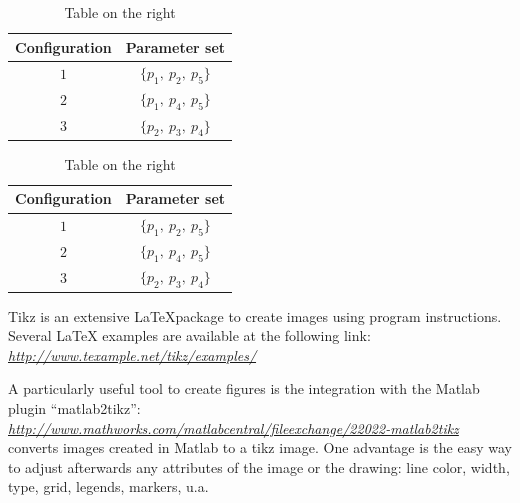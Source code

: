 \begin{table}[htbp]
\caption{Main numbering}
\centering
	\begin{subtable}[t]{.5\textwidth}
	\centering
			\caption{Table on the left}
			\begin{tabular}{cc}
				\toprule
				Configuration & Parameter set \\
				\midrule
				$1$ & $\{p_{1}, \: p_{2}, \: p_{5}\}$ \\
				$2$ & $\{p_{1}, \: p_{4}, \: p_{5}\}$ \\
				$3$ & $\{p_{2}, \: p_{3}, \: p_{4}\}$ \\
				\bottomrule
			\end{tabular}
			\label{tab:parameter_tabelle1}
	\end{subtable}%
	\begin{subtable}[t]{.5\textwidth}
			\centering
			\caption{Table on the right}
			\begin{tabular}{cc}
				\toprule
				Configuration & Parameter set \\
				\midrule
				$1$ & $\{p_{1}, \: p_{2}, \: p_{5}\}$ \\
				$2$ & $\{p_{1}, \: p_{4}, \: p_{5}\}$ \\
				$3$ & $\{p_{2}, \: p_{3}, \: p_{4}\}$ \\
				\bottomrule
			\end{tabular}
			\label{tab:parameter_tabelle2}
	\end{subtable}
	\label{tab:parameter_tabellen}
\end{table}




%
%
%
\clearpage
\label{sec:tikz}

Tikz is an extensive \LaTeX package to create images using program instructions.
Several LaTeX examples are available at the following link: \\
\href{http://www.texample.net/tikz/examples/}{\emph{http://www.texample.net/tikz/examples/}}

A particularly useful tool to create figures is the integration with the Matlab plugin "`matlab2tikz"':\\
\href{http://www.mathworks.com/matlabcentral/fileexchange/22022-matlab2tikz}{\emph{http://www.mathworks.com/matlabcentral/fileexchange/22022-matlab2tikz}}\\
converts images created in Matlab to a tikz image.
One advantage is the easy way to adjust afterwards any attributes of the image or the drawing: line color, width, type, grid, legends, markers, u.a.

